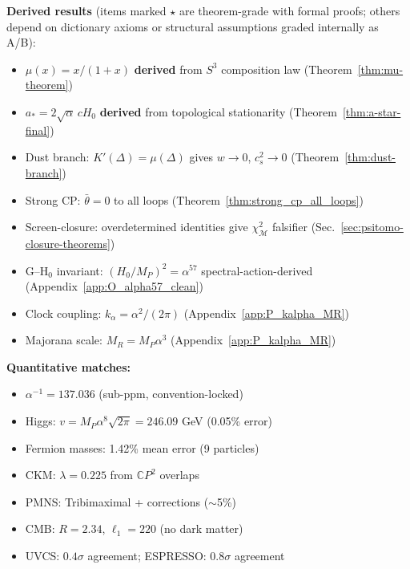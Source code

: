 \begin{tcolorbox}[colback=blue!5!white, colframe=blue!50!black, title=DFD: Unified Framework + Falsifiable Predictions, boxsep=3pt, left=3pt, right=3pt]
\small
\textbf{Derived results} (items marked $\star$ are theorem-grade with formal proofs; others depend on dictionary axioms or structural assumptions graded internally as A/B):
\begin{itemize}[itemsep=1pt, leftmargin=*, labelsep=4pt]
\item[$\star$] $\mu(x) = x/(1+x)$ \textbf{derived} from $S^3$ composition law (Theorem~\ref{thm:mu-theorem})
\item[$\star$] $a_* = 2\sqrt{\alpha}\,cH_0$ \textbf{derived} from topological stationarity (Theorem~\ref{thm:a-star-final})
\item[$\star$] Dust branch: $K'(\Delta)=\mu(\Delta)$ gives $w \to 0$, $c_s^2 \to 0$ (Theorem~\ref{thm:dust-branch})
\item[$\star$] Strong CP: $\bar{\theta} = 0$ to all loops (Theorem~\ref{thm:strong_cp_all_loops})
\item Screen-closure: overdetermined identities give $\chi^2_{\mathcal{M}}$ falsifier (Sec.~\ref{sec:psitomo-closure-theorems})
\item G--H$_0$ invariant: $(H_0/M_P)^2 = \alpha^{57}$ spectral-action-derived (Appendix~\ref{app:O_alpha57_clean})
\item Clock coupling: $k_\alpha = \alpha^2/(2\pi)$ (Appendix~\ref{app:P_kalpha_MR})
\item Majorana scale: $M_R = M_P\alpha^3$ (Appendix~\ref{app:P_kalpha_MR})
\end{itemize}

\smallskip
\textbf{Quantitative matches:}
\begin{itemize}[itemsep=1pt, leftmargin=*, labelsep=4pt]
\item $\alpha^{-1} = 137.036$ (sub-ppm, convention-locked)
\item Higgs: $v = M_P\alpha^8\sqrt{2\pi} = 246.09$ GeV (0.05\% error)
\item Fermion masses: 1.42\% mean error (9 particles)
\item CKM: $\lambda = 0.225$ from $\mathbb{C}P^2$ overlaps
\item PMNS: Tribimaximal + corrections ($\sim$5\%)
\item CMB: $R = 2.34$, $\ell_1 = 220$ (no dark matter)
\item UVCS: $0.4\sigma$ agreement; ESPRESSO: $0.8\sigma$ agreement
\end{itemize}


\end{tcolorbox}
